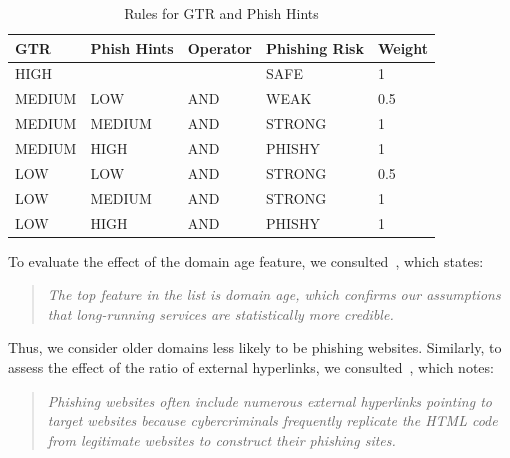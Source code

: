 \documentclass[11pt]{article}
\begin{document}
\begin{table}[h]
    \centering
    \begin{tabular}{|l|l|l|l|l|}
    \hline
    \textbf{GTR} & \textbf{Phish Hints} & \textbf{Operator} & \textbf{Phishing Risk} & \textbf{Weight} \\ \hline
    HIGH               &                     &                   & SAFE                   & 1               \\ \hline
    MEDIUM             & LOW                 & AND               & WEAK                   & 0.5             \\ \hline
    MEDIUM             & MEDIUM              & AND               & STRONG                 & 1               \\ \hline
    MEDIUM             & HIGH                & AND               & PHISHY                 & 1               \\ \hline
    LOW                & LOW                 & AND               & STRONG                 & 0.5             \\ \hline
    LOW                & MEDIUM              & AND               & STRONG                 & 1               \\ \hline
    LOW                & HIGH                & AND               & PHISHY                 & 1               \\ \hline
    \end{tabular}
    \caption{Rules for GTR and Phish Hints}
    \label{page_rank_phish_hints_rules}
\end{table}

To evaluate the effect of the domain age feature, we consulted~\cite{domainage}, which states:

\begin{quote}
\textit{The top feature in the list is domain age, which confirms our assumptions that long-running services are statistically more credible.}
\end{quote}

Thus, we consider older domains less likely to be phishing websites. Similarly, to assess the effect of the ratio of external hyperlinks, we consulted~\cite{externalhyperlinks}, which notes:

\begin{quote}
\textit{Phishing websites often include numerous external hyperlinks pointing to target websites because cybercriminals frequently replicate the HTML code from legitimate websites to construct their phishing sites.}
\end{quote}
\end{document}
